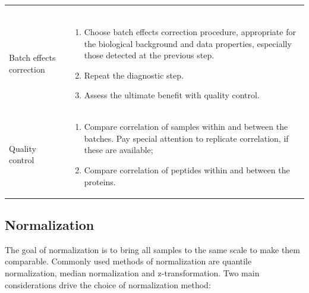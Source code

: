 \documentclass[num-refs]{wiley-article}
\begin{document}
\begin{table}[hbt]
\begin{tcolorbox}
\begin{tabular}{>{\raggedright}p{2cm}m{10.5cm}}
\begin{enumerate}
			\end{enumerate} \\ 
			Batch effects correction	& 	\begin{enumerate}
				\item	Choose batch effects correction procedure, appropriate for the biological background and data properties, especially those detected at the previous step.
			\item	Repeat the diagnostic step.
			\item	Assess the ultimate benefit with quality control.
\end{enumerate} \\ 

			Quality control 	& 	\begin{enumerate}
				
				\item	Compare correlation of samples within and between the batches. Pay special attention to replicate correlation, if these are available;
				\item	Compare correlation of peptides within and between the proteins.	
			\end{enumerate} \\ 
		\end{tabular}
		
	\end{tcolorbox}
\end{table}
\clearpage

\subsection{Normalization}

The goal of normalization is to bring all samples to the same scale to make them comparable. Commonly used methods of normalization are quantile normalization, median normalization and z-transformation. Two main considerations drive the choice of normalization method: 
\end{document}

